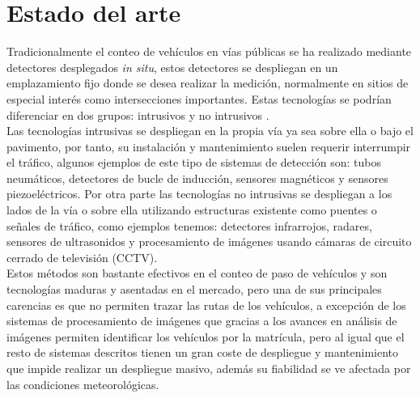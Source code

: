 \documentclass[../proyecto.tex]{subfiles}
\begin{document}
\chapter{Estado del arte}\label{chap:estado_arte}

Tradicionalmente el conteo de vehículos en vías públicas se ha realizado mediante detectores desplegados \textit{in situ}, estos detectores se despliegan en un emplazamiento fijo donde se desea realizar la medición, normalmente en sitios de especial interés como intersecciones importantes. Estas tecnologías se podrían diferenciar en dos grupos: intrusivos y no intrusivos \cite{MIMBELA20078}.\\

Las tecnologías intrusivas se despliegan en la propia vía ya sea sobre ella o bajo el pavimento, por tanto, su instalación y mantenimiento suelen requerir interrumpir el tráfico, algunos ejemplos de este tipo de sistemas de detección son: tubos neumáticos, detectores de bucle de inducción, sensores magnéticos y sensores piezoeléctricos. Por otra parte las tecnologías no intrusivas se despliegan a los lados de la vía o sobre ella utilizando estructuras existente como puentes o señales de tráfico, como ejemplos tenemos: detectores infrarrojos, radares, sensores de ultrasonidos y  procesamiento de imágenes usando cámaras de circuito cerrado de televisión (CCTV).\\

 Estos métodos son bastante efectivos en el conteo de paso de vehículos \cite{CZYZEWSKI20196} y son tecnologías maduras y asentadas en el mercado, pero una de sus principales carencias es que no permiten trazar las rutas de los vehículos, a excepción de los sistemas de procesamiento de imágenes que gracias a los avances en análisis de imágenes permiten identificar los vehículos por la matrícula, pero al igual que el resto de sistemas descritos tienen un gran coste de despliegue y mantenimiento que impide realizar un despliegue masivo, además su fiabilidad se ve afectada por las condiciones meteorológicas.\\
\end{document}
